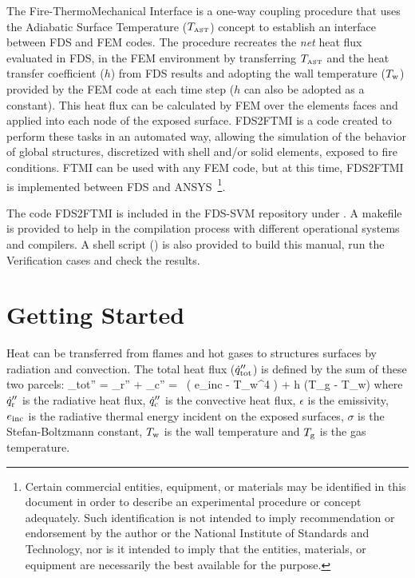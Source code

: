 \documentclass[11pt]{book}
\begin{document}
The Fire-ThermoMechanical Interface \cite{FTMI:Methodology} is a one-way coupling procedure that uses the Adiabatic Surface Temperature ($T_{\hbox{\tiny AST}}$) concept \cite{Wickstrom:Interflam2007,Wickstrom_AST} to establish an interface between FDS and FEM codes. The procedure recreates the {\em net} heat flux evaluated in FDS, in the FEM environment by transferring $T_{\hbox{\tiny AST}}$ and the heat transfer coefficient ($h$) from FDS results and adopting the wall temperature ($T_{\rm w}$) provided by the FEM code at each time step  ($h$ can also be adopted as a constant). This heat flux can be calculated by FEM over the elements faces and applied into each node of the exposed surface. FDS2FTMI is a code created to perform these tasks in an automated way, allowing the simulation of the behavior of global structures, discretized with shell and/or solid elements, exposed to fire conditions. FTMI can be used with any FEM code, but at this time, FDS2FTMI is implemented between FDS and A{\footnotesize NSYS}~\footnote{Certain commercial entities, equipment, or materials may be identified in this document in order to describe an experimental procedure or concept adequately. Such identification is not intended to imply recommendation or endorsement by the author or the National Institute of Standards and Technology, nor is it intended to imply that the entities, materials, or equipment are necessarily the best available for the purpose.}.

The code FDS2FTMI is included in the FDS-SVM repository \cite{FDS-SMV_repository} under . A makefile is provided to help in the compilation process with different operational systems and compilers. A shell script () is also provided to build this manual, run the Verification cases and check the results.  


\chapter{Getting Started}
\label{info:start}

Heat can be transferred from flames and hot gases to structures surfaces by radiation and convection. The total heat flux ($\dot{q}_{\rm tot}''$) is defined by the sum of these two parcels: 
\be \label{eq_qtot} _{\rm tot}'' = _{\rm r}'' + _{\rm c}'' = \epsilon \, \left( {e}_{\rm inc} - \sigma T_{\rm w}^4 \right) + h (T_{\rm g} - T_{\rm w})  \ee  
where $\dot{q}_{\rm r}''$ is the radiative heat flux, $\dot{q}_{\rm c}''$ is the convective heat flux, $\epsilon$ is the emissivity, ${e}_{\rm inc}$ is the radiative thermal energy incident on the exposed surfaces, $\sigma$ is the Stefan-Boltzmann constant, $T_{\rm w}$ is the wall temperature and $T_{\rm g}$ is the gas temperature.
\end{document}
